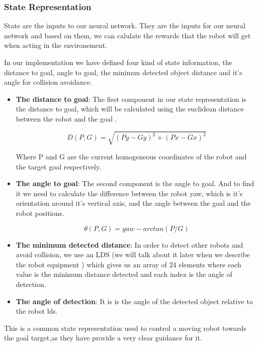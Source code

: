 \documentclass[12pt]{extarticle}
\begin{document}
\subsubsection{State Representation}
State  are the inputs to our neural network. They are the inputs for our neural network and  based on them, we can  calulate  the rewards that the robot will get when acting in the environement.

In our implementation we have defined four kind  of state information, the distance to goal, angle to goal, the minimun detected object distance and it's angle for collision avoidance.



\pagebreak
\begin{itemize}
\item \textbf{The distance to goal}: 
The first component in our state representation is the distance to goal, which will be calculated using the euclidean distance  between the robot and the goal .


\[ D(P,G)=\sqrt{(Py-Gy)^2+(Px-Gx)^2}  \] 

Where P and G are the current homogeneous coordinates of the robot and the target goal respectively.

\item \textbf{The angle to goal}: 
The second component  is the angle  to goal. And to find it we need to calculate  the difference between the robot yaw, which is it's orientation around it's vertical axis, and the angle between the goal and the robot positions.


\[ \theta(P,G)=yaw-arctan(P/G)  \] 


\item \textbf{The minimum detected distance}: 
In order to detect other robots and avoid collision, we use an  LDS (we will talk about it later when we describe the robot equipment )  which gives us an array of 24 elements where each value is the minimum distance detected and each index is the angle of detection.


\item \textbf{The angle of detection}: 
It is is the angle of the detected object relative to the robot lds.



\end{itemize}

This is a common state representation used  to control a moving robot towards the goal target,as they have provide a very clear guidance for it. 
\cite{quiroga2022position} \cite{gong2022efficient}
\end{document}
